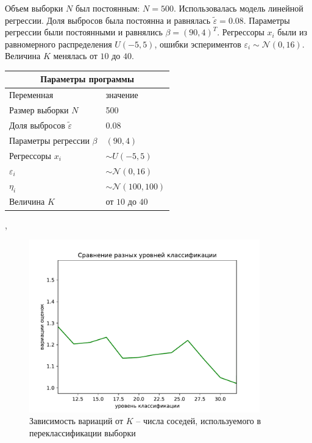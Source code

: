 Объем выборки $N$ был постоянным: $N=500$. Использовалась модель линейной регрессии. Доля выбросов была постоянна и равнялась $\widetilde{\varepsilon}=0.08$. Параметры регрессии были постоянными и равнялись $\beta=(90,4)^T$. 
Регрессоры $x_i$ были из равномерного распределения $U(-5,5)$, ошибки эспериментов $\varepsilon_i\sim \mathcal{N}(0,16)$. Величина $K$ менялась от $10$ до $40$.
\newpage
\begin{center}
    \label{tab1}
    \begin{tabular}{|p{5cm}|p{5cm}|}
        \hline
        \multicolumn{2}{|c|}{Параметры программы} \\
        \hline
        Переменная&значение\\
        \hline
        Размер выборки $N$& 500\\
        \hline
        Доля выбросов $\widetilde{\varepsilon}$& 0.08\\
        \hline
        Параметры регрессии $\beta$& $(90,4)$\\
        \hline
        Регрессоры $x_i$ & $\sim U(-5,5)$\\
        \hline
        $\varepsilon_i$&$\sim \mathcal{N}(0,16)$\\
        \hline
        $\eta_i$&$\sim \mathcal{N}(100,100)$\\
        \hline
        Величина $K$  &от $10$ до $40$\\
        \hline
    \end{tabular},
\end{center}

\begin{figure}[h!]
    \centering
    \includegraphics[width=100mm]{../images/different_recl_level.pdf}
    \caption{Зависимость вариаций от $K$ -- числа соседей, используемого в переклассификации выборки\label{overflow}}
    \label{pic1}
\end{figure}

